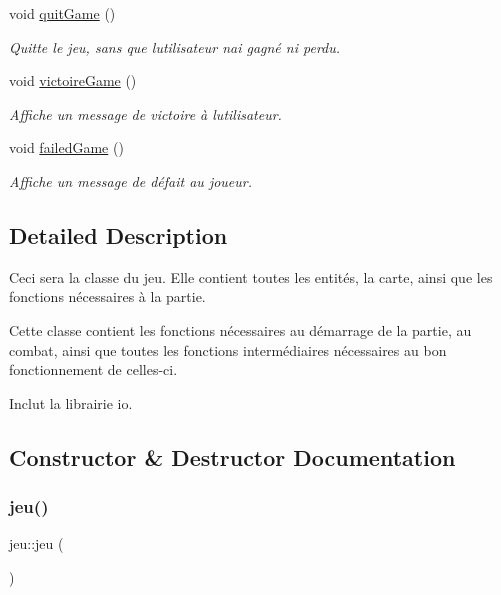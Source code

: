 \begin{DoxyCompactItemize}
void \hyperlink{classjeu_a110399c4103d3d4391f2007856c3e009}{quit\+Game} ()
\begin{DoxyCompactList}\small\item\em Quitte le jeu, sans que l\textquotesingle{}utilisateur n\textquotesingle{}ai gagné ni perdu. \end{DoxyCompactList}\item 
void \hyperlink{classjeu_a7c769fff9b23935aef40d6633d774a96}{victoire\+Game} ()
\begin{DoxyCompactList}\small\item\em Affiche un message de victoire à l\textquotesingle{}utilisateur. \end{DoxyCompactList}\item 
void \hyperlink{classjeu_aa6163ba51f80fa944374fc1b85021268}{failed\+Game} ()
\begin{DoxyCompactList}\small\item\em Affiche un message de défait au joueur. \end{DoxyCompactList}\end{DoxyCompactItemize}


\subsection{Detailed Description}
Ceci sera la classe du jeu. Elle contient toutes les entités, la carte, ainsi que les fonctions nécessaires à la partie. 

Cette classe contient les fonctions nécessaires au démarrage de la partie, au combat, ainsi que toutes les fonctions intermédiaires nécessaires au bon fonctionnement de celles-\/ci.

Inclut la librairie io. 

\subsection{Constructor \& Destructor Documentation}
\mbox{\label{classjeu_a38513a7bfd0a7ea4e3a5612da2856016}} 
\subsubsection{\texorpdfstring{jeu()}{jeu()}}
{\footnotesize\ttfamily jeu\+::jeu (\begin{DoxyParamCaption}{ }\end{DoxyParamCaption})}



